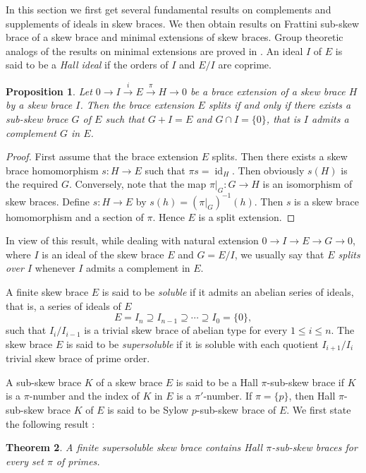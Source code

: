 \documentclass[11pt]{amsart}
\theoremstyle{thrm}
\theoremstyle{plain}
\newtheorem{thm}{Theorem}[section]
\newtheorem{prop}[thm]{Proposition}
\theoremstyle{definition}
\newcommand{\Id}{\operatorname{id}}
\numberwithin{equation}{section}
\begin{document}
In this section we first get several fundamental results on complements and supplements of ideals in skew braces. We then obtain results on Frattini sub-skew brace of a skew brace and minimal extensions of skew braces.  Group theoretic analogs of the results on minimal extensions are proved in \cite{Hill72}.  An ideal $I$ of $E$ is said to be  a \emph{Hall ideal} if the orders of $I$ and $E/I$ are coprime. 
\begin{prop}
Let $0 \longrightarrow I \xrightarrow{i} E \xrightarrow{\pi} H \longrightarrow 0$ be a brace extension of a skew brace $H$ by a skew brace $I$. Then the brace extension $E$  splits if and only if there exists a sub-skew brace $G$ of $E$ such that $G+I = E$ and $G \cap I = \{0\}$, that is $I$ admits a complement $G$ in $E$. 
\end{prop}
\begin{proof}
First assume that the brace extension $E$ splits. Then there exists a skew brace homomorphism $s : H \to E$ such that $\pi s = \Id_H$. Then obviously $s(H)$ is the required $G$.
Conversely, note  that the map $\pi|_G: G \rightarrow H$ is an isomorphism of skew braces. Define $s: H \rightarrow E$ by $s(h) = (\pi|_G)^{-1}(h)$. Then $s$ is a skew brace homomorphism and  a section of $\pi$. Hence $E$ is a split extension. 
\end{proof}

In view of this result, while dealing with natural extension $0 \to I \to E \to G \to 0$, where $I$ is an ideal of the skew brace $E$ and $G = E/I$, we usually say that {\it $E$ splits over $I$} whenever $I$ admits a complement in $E$. 

A finite skew brace $E$ is said to be \emph{soluble} if it  admits an abelian series of ideals, that is, a series of ideals of $E$
	\[
	E = I_n \supseteq I_{n-1} \supseteq \cdots \supseteq I_0 = \{0\},
	\]
such that $I_{i}/I_{i-1}$ is a trivial skew brace of abelian type for every $1 \leq i \leq n$.
The  skew brace $E$ is said to be \emph{supersoluble} if it is soluble with 
each quotient  $I_{i+1}/I_i$  trivial skew brace of prime order.



 A sub-skew brace $K$ of a skew brace $E$ is said to be a Hall $\pi$-sub-skew brace if $K$ is a $\pi$-number and the index of $K$ in $E$ is a $\pi'$-number. If $\pi = \{p\}$, then Hall $\pi$-sub-skew brace $K$ of $E$ is said to be Sylow $p$-sub-skew brace of $E$. We first state the following result  \cite[Theorem~1.6]{CDMFT25}:

\begin{thm}\label{CDMFT}
A finite supersoluble skew brace contains Hall $\pi$-sub-skew braces for every set $\pi$ of primes.
\end{thm}
\end{document}
